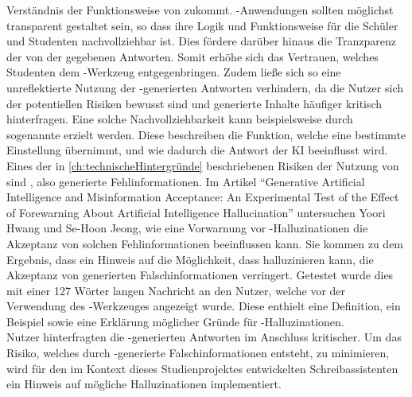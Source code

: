 \documentclass[../main.tex]{subfiles}
\begin{document}
Verständnis der Funktionsweise von  zukommt. -Anwendungen sollten möglichst transparent gestaltet sein, so dass ihre Logik und Funktionsweise für die Schüler und 
Studenten nachvollziehbar ist. Dies fördere darüber hinaus die Tranzparenz der von der  gegebenen Antworten. Somit erhöhe sich das Vertrauen, welches Studenten dem -Werkzeug 
entgegenbringen\cite[10]{influencingUsingAi}. Zudem ließe sich so eine unreflektierte Nutzung der -generierten Antworten verhindern, da die Nutzer sich der 
potentiellen Risiken bewusst sind und generierte Inhalte häufiger kritisch hinterfragen\cite[10]{influencingUsingAi}. Eine solche Nachvollziehbarkeit kann 
beispielsweise durch sogenannte  erzielt werden. Diese beschreiben die Funktion, welche eine bestimmte Einstellung übernimmt, und wie dadurch die Antwort der 
KI beeinflusst wird.\\  
Eines der in \autoref{ch:technischeHintergründe} beschriebenen Risiken der Nutzung von  sind , also generierte Fehlinformationen. Im Artikel "`Generative Artificial Intelligence 
and Misinformation Acceptance: An Experimental Test of the Effect of Forewarning About Artificial Intelligence Hallucination"' untersuchen Yoori Hwang und Se-Hoon Jeong, 
wie eine Vorwarnung vor -Halluzinationen die Akzeptanz von solchen Fehlinformationen beeinflussen kann. Sie kommen zu dem Ergebnis, dass ein Hinweis auf 
die Möglichkeit, dass  halluzinieren kann, die Akzeptanz von generierten Falschinformationen verringert. Getestet wurde dies mit einer 127 Wörter langen Nachricht an 
den Nutzer, welche vor der Verwendung des -Werkzeuges angezeigt wurde. Diese enthielt eine Definition, ein Beispiel sowie eine Erklärung möglicher Gründe für -Halluzinationen\cite[285]{hallucinationForewarning}. \\Nutzer hinterfragten die -generierten Antworten im Anschluss kritischer. Um das Risiko, welches durch -generierte Falschinformationen 
entsteht, zu minimieren, wird für den im Kontext dieses Studienprojektes entwickelten Schreibassistenten ein Hinweis auf mögliche Halluzinationen implementiert.\cite{hallucinationForewarning}
\end{document}
